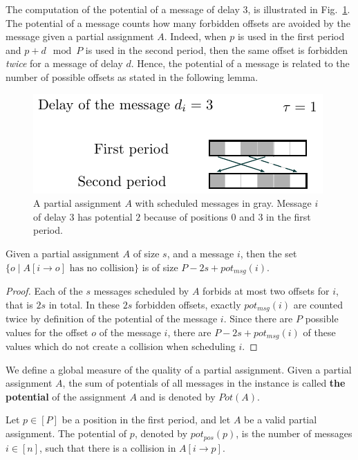 \documentclass[a4paper,UKenglish,cleveref, autoref, thm-restate]{lipics-v2019}
\begin{document}
The computation of the potential of a message of delay $3$, is illustrated in Fig.~\ref{fig:messagepotential}. The potential of a message counts how many forbidden offsets are avoided by the message given a partial assignment $A$.
Indeed, when $p$ is used in the first period and $p+d \mod P$ is used in the second period,
then the same offset is forbidden \emph{twice} for a message of delay $d$. Hence, the potential of a message is related to the number of possible offsets as stated in the following lemma. 
\begin{figure}
\begin{center}
\includegraphics[scale=1]{messagepotential}
\end{center}
\caption{A partial assignment $A$ with scheduled messages in gray. Message $i$ of delay $3$ has potential $2$ because of positions $0$ and $3$ in the first period.}
\label{fig:messagepotential}
\end{figure}

\begin{lemma}\label{lemma:pot_msg}
Given a partial assignment $A$ of size $s$, and a message $i$, then the set $\{o \mid A[i \rightarrow o] \text{ has no collision}\}$ is of size $P - 2s + pot_{msg}(i)$.
\end{lemma}
\begin{proof}
 Each of the $s$ messages scheduled by $A$ forbids at most two offsets for $i$, that is $2s$ in total. In these $2s$ forbidden offsets, exactly $pot_{msg}(i)$ are counted twice by definition of the potential of the message $i$. Since there are $P$ possible values for the offset $o$ of the message $i$, there are $P - 2s + pot_{msg}(i)$ of these values which do not create a collision when scheduling $i$.
\end{proof}

We define a global measure of the quality of a partial assignment. 
Given a partial assignment $A$, the sum of potentials of all messages in the instance is called \textbf{the potential} of the assignment $A$ and is denoted by $Pot(A)$. 


\begin{definition}
Let $p \in [P]$ be a position in the first period, and let $A$ be a valid partial assignment. The potential of $p$, denoted by $pot_{pos}(p)$, is the number of messages $i \in [n]$, such that there is a collision in $A[i \rightarrow p]$. 
\end{definition}
\end{document}
